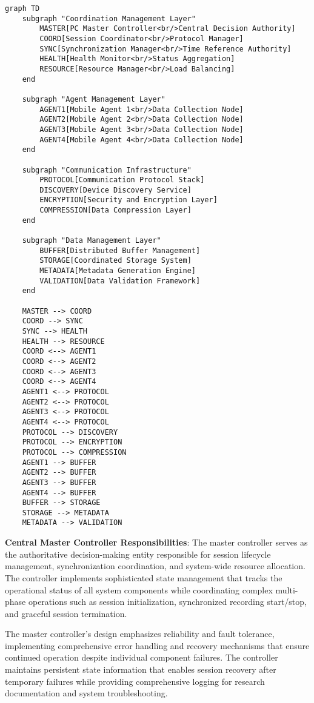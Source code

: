 \documentclass[12pt,a4paper]{article}
\begin{document}
\begin{verbatim}
graph TD
    subgraph "Coordination Management Layer"
        MASTER[PC Master Controller<br/>Central Decision Authority]
        COORD[Session Coordinator<br/>Protocol Manager]
        SYNC[Synchronization Manager<br/>Time Reference Authority]
        HEALTH[Health Monitor<br/>Status Aggregation]
        RESOURCE[Resource Manager<br/>Load Balancing]
    end

    subgraph "Agent Management Layer"
        AGENT1[Mobile Agent 1<br/>Data Collection Node]
        AGENT2[Mobile Agent 2<br/>Data Collection Node]
        AGENT3[Mobile Agent 3<br/>Data Collection Node]
        AGENT4[Mobile Agent 4<br/>Data Collection Node]
    end

    subgraph "Communication Infrastructure"
        PROTOCOL[Communication Protocol Stack]
        DISCOVERY[Device Discovery Service]
        ENCRYPTION[Security and Encryption Layer]
        COMPRESSION[Data Compression Layer]
    end

    subgraph "Data Management Layer"
        BUFFER[Distributed Buffer Management]
        STORAGE[Coordinated Storage System]
        METADATA[Metadata Generation Engine]
        VALIDATION[Data Validation Framework]
    end

    MASTER --> COORD
    COORD --> SYNC
    SYNC --> HEALTH
    HEALTH --> RESOURCE
    COORD <--> AGENT1
    COORD <--> AGENT2
    COORD <--> AGENT3
    COORD <--> AGENT4
    AGENT1 <--> PROTOCOL
    AGENT2 <--> PROTOCOL
    AGENT3 <--> PROTOCOL
    AGENT4 <--> PROTOCOL
    PROTOCOL --> DISCOVERY
    PROTOCOL --> ENCRYPTION
    PROTOCOL --> COMPRESSION
    AGENT1 --> BUFFER
    AGENT2 --> BUFFER
    AGENT3 --> BUFFER
    AGENT4 --> BUFFER
    BUFFER --> STORAGE
    STORAGE --> METADATA
    METADATA --> VALIDATION
\end{verbatim}

\textbf{Central Master Controller Responsibilities}: The master controller serves as the authoritative decision-making entity
responsible for session lifecycle management, synchronization coordination, and system-wide resource allocation. The
controller implements sophisticated state management that tracks the operational status of all system components while
coordinating complex multi-phase operations such as session initialization, synchronized recording start/stop, and
graceful session termination.

The master controller's design emphasizes reliability and fault tolerance, implementing comprehensive error handling and
recovery mechanisms that ensure continued operation despite individual component failures. The controller maintains
persistent state information that enables session recovery after temporary failures while providing comprehensive
logging for research documentation and system troubleshooting.
\end{document}
